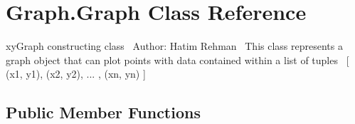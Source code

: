 \hypertarget{class_graph_1_1_graph}{}\section{Graph.\+Graph Class Reference}
\label{class_graph_1_1_graph}


xy\+Graph constructing class~\newline
 Author\+: Hatim Rehman~\newline
 This class represents a graph object that can plot points with data contained within a list of tuples~\newline
\mbox{[} (x1, y1), (x2, y2), ... , (xn, yn) \mbox{]}  


\subsection*{Public Member Functions}
